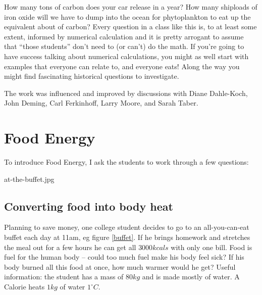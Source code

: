\documentclass[onecolumn]{article}
\begin{document}
How many tons of carbon does your car release in a year? How many shiploads of iron oxide will we have to dump into the ocean for phytoplankton to eat up the equivalent about of carbon?  Every question in a class like this is, to at least some extent, informed by numerical calculation and it is pretty arrogant to assume that ``those students'' don't need to (or can't) do the math.  If you're going to have success talking about numerical calculations, you might as well start with examples that everyone can relate to, and everyone eats!  Along the way you might find fascinating historical questions to investigate.   


The work was influenced and improved by discussions with 
Diane Dahle-Koch, 
John Deming, 
Carl Ferkinhoff, 
Larry Moore, 
and Sarah Taber.

\clearpage
\newpage


\appendix

\section{Food Energy}
\label{food_energy_introduction}

To introduce Food Energy, I ask the students to work through a few questions:

at-the-buffet.jpg

\subsection{Converting food into body heat}
Planning to save money, one college student decides to go to an all-you-can-eat buffet each day at 11am, eg figure \ref{buffet}.  If he brings homework and stretches the meal out for a few hours he can get all $3000kcals$ with only one bill.  Food is fuel for the human body -- could too much fuel make his body feel sick? If his body burned all this food at once, how much warmer would he get? 
Useful information: the student has a mass of $80kg$ and is made mostly of water.  A Calorie heats $1 kg$ of water $1^{\circ}C$. 
\end{document}
